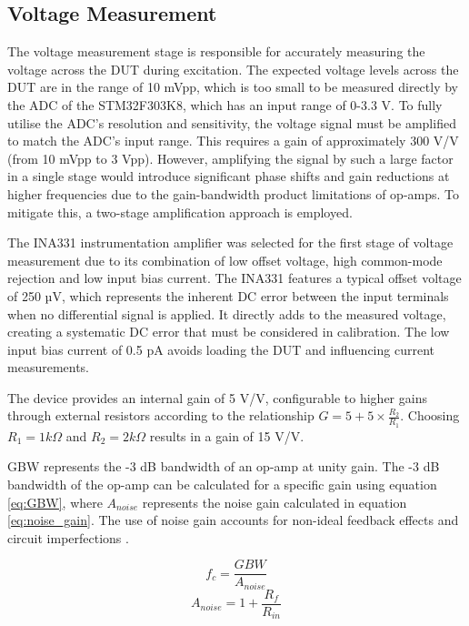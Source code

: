 \subsection{Voltage Measurement}
The voltage measurement stage is responsible for accurately measuring the voltage across the \ac{DUT} during excitation. The expected voltage levels across the \ac{DUT} are in the range of 10 mVpp, which is too small to be measured directly by the \ac{ADC} of the STM32F303K8, which has an input range of 0-3.3 V. To fully utilise the \ac{ADC}'s resolution and sensitivity, the voltage signal must be amplified to match the \ac{ADC}'s input range. This requires a gain of approximately 300 V/V (from 10 mVpp to 3 Vpp). However, amplifying the signal by such a large factor in a single stage would introduce significant phase shifts and gain reductions at higher frequencies due to the gain-bandwidth product limitations of op-amps. To mitigate this, a two-stage amplification approach is employed.

The INA331 instrumentation amplifier was selected for the first stage of voltage measurement due to its combination of low offset voltage, high common-mode rejection and low input bias current. The INA331 features a typical offset voltage of 250 µV, which represents the inherent DC error between the input terminals when no differential signal is applied. It directly adds to the measured voltage, creating a systematic DC error that must be considered in calibration. The low input bias current of 0.5 pA avoids loading the \ac{DUT} and influencing current measurements. 

The device provides an internal gain of 5 V/V, configurable to higher gains through external resistors according to the relationship $G = 5 + 5\times \frac{R_2}{R_1}$. Choosing $R_1=1 k\Omega$ and $R_2=2 k\Omega$ results in a gain of 15 V/V. 

\Ac{GBW} represents the -3 dB bandwidth of an op-amp at unity gain. The -3 dB bandwidth of the op-amp can be calculated for a specific gain using equation \ref{eq:GBW}, where $A_{noise}$ represents the noise gain calculated in equation \ref{eq:noise_gain}. The use of noise gain accounts for non-ideal feedback effects and circuit imperfections \cite{fiore53GainBandwidthProduct2018}.

\begin{equation}
    f_c = \frac{GBW}{A_{noise}}
    \label{eq:GBW}
\end{equation}
\begin{equation}
    A_{noise} = 1 + \frac{R_f}{R_{in}}
    \label{eq:noise_gain}
\end{equation}

